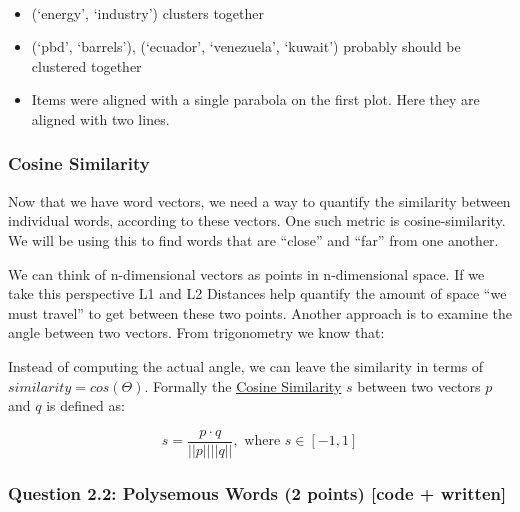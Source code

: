 \documentclass[11pt]{article}
\providecommand{\tightlist}{%
      \setlength{\itemsep}{0pt}\setlength{\parskip}{0pt}}
\begin{document}
    \begin{center}
    \end{center}
    { \hspace*{\fill} \\}
    
    \begin{itemize}
\tightlist
\item
  (`energy', `industry') clusters together
\item
  (`pbd', `barrels'), (`ecuador', `venezuela', `kuwait') probably should
  be clustered together
\item
  Items were aligned with a single parabola on the first plot. Here they
  are aligned with two lines.
\end{itemize}

    \hypertarget{cosine-similarity}{%
\subsubsection{Cosine Similarity}\label{cosine-similarity}}

Now that we have word vectors, we need a way to quantify the similarity
between individual words, according to these vectors. One such metric is
cosine-similarity. We will be using this to find words that are
``close'' and ``far'' from one another.

We can think of n-dimensional vectors as points in n-dimensional space.
If we take this perspective L1 and L2 Distances help quantify the amount
of space ``we must travel'' to get between these two points. Another
approach is to examine the angle between two vectors. From trigonometry
we know that:

Instead of computing the actual angle, we can leave the similarity in
terms of \(similarity = cos(\Theta)\). Formally the
\href{https://en.wikipedia.org/wiki/Cosine_similarity}{Cosine
Similarity} \(s\) between two vectors \(p\) and \(q\) is defined as:

\[s = \frac{p \cdot q}{||p|| ||q||}, \textrm{ where } s \in [-1, 1] \]

    \hypertarget{question-2.2-polysemous-words-2-points-code-written}{%
\subsubsection{Question 2.2: Polysemous Words (2 points) {[}code +
written{]}}\label{question-2.2-polysemous-words-2-points-code-written}}
\end{document}
